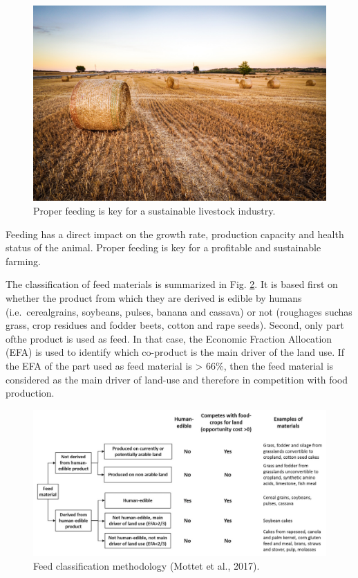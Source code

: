 \documentclass[]{book}
\begin{document}
\begin{figure}

{\centering \includegraphics[width=1\linewidth]{figures/hay-feed} 

}

\caption{Proper feeding is key for a sustainable livestock industry.}\label{fig:hay-feed}
\end{figure}

Feeding has a direct impact on the growth rate, production capacity and
health status of the animal. Proper feeding is key for a profitable and
sustainable farming.

The classification of feed materials is summarized in Fig.
\ref{fig:feed-classification}. It is based first on whether the product
from which they are derived is edible by humans (i.e.~cerealgrains,
soybeans, pulses, banana and cassava) or not (roughages suchas grass,
crop residues and fodder beets, cotton and rape seeds). Second, only
part ofthe product is used as feed. In that case, the Economic Fraction
Allocation (EFA) is used to identify which co-product is the main driver
of the land use. If the EFA of the part used as feed material is
\textgreater{} 66\%, then the feed material is considered as the main
driver of land-use and therefore in competition with food production.

\begin{figure}

{\centering \includegraphics[width=1\linewidth]{figures/feed-classification} 

}

\caption{Feed classification methodology (Mottet et al., 2017).}\label{fig:feed-classification}
\end{figure}
\end{document}
